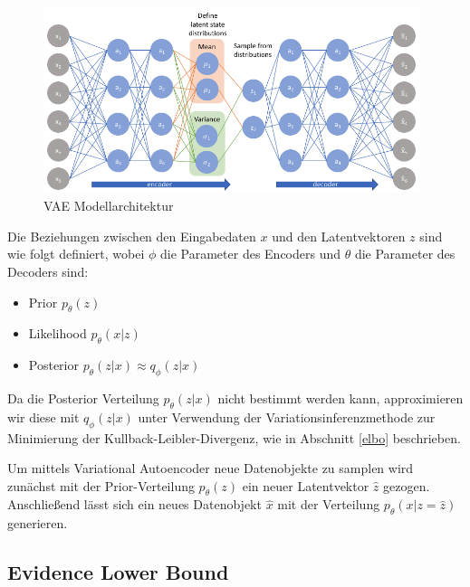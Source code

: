 \begin{figure}[h]
    \centering
    \includegraphics[width=11cm]{bilder/vae}
    \caption{VAE Modellarchitektur \citep{jordan_2018}}
    \label{vae_model}
\end{figure}
Die Beziehungen zwischen den Eingabedaten $x$ und den Latentvektoren $z$ sind wie folgt definiert, wobei $\phi$ die Parameter des Encoders und $\theta$ die Parameter des Decoders sind:
\begin{itemize}
\item Prior $p_\theta (z)$
\item Likelihood $p_\theta (x|z)$
\item Posterior $p_\theta (z|x)  \approx q_\phi (z|x)$
\end{itemize}

Da die Posterior Verteilung $p_\theta (z|x)$ nicht bestimmt werden kann, approximieren wir diese mit $q_\phi (z|x)$ unter Verwendung der Variationsinferenzmethode zur Minimierung der Kullback-Leibler-Divergenz, wie in Abschnitt \ref{elbo} beschrieben.

Um mittels Variational Autoencoder neue Datenobjekte zu samplen wird zunächst mit der Prior-Verteilung $p_\theta (z)$ ein neuer Latentvektor $\hat{z}$ gezogen. Anschließend lässt sich ein neues Datenobjekt $\hat{x}$ mit der Verteilung $p_\theta (x|z=\hat{z})$ generieren.
\subsection{Evidence Lower Bound}

